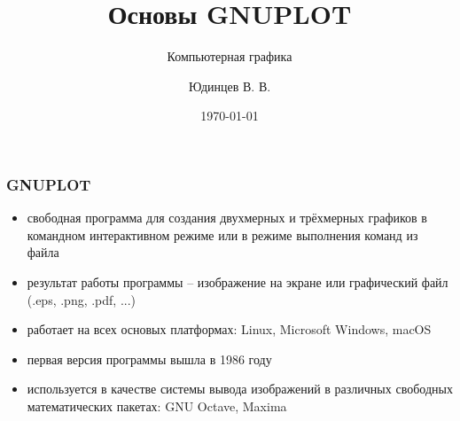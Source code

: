 \documentclass[12pt, compress]{beamer}
\title[Основы GNUPLOT]{Основы GNUPLOT}
\subtitle{Компьютерная графика}
\author[Самарский университет]{Юдинцев В. В.}
\institute{Кафедра теоретической механики}
\date{\today}
\renewcommand{\emph}[1]{\textcolor{dark-blue}{#1}}
\begin{document}
{
\begin{frame}[plain]
\maketitle
\end{frame}
}

%
%

\begin{frame}[c]
\frametitle{GNUPLOT}
\begin{itemize}
\item \emph{свободная} программа для создания двухмерных и трёхмерных графиков в командном интерактивном режиме или в режиме выполнения команд из файла
\item результат работы программы -- изображение на экране или графический файл (.eps, .png, .pdf, ...)
\item работает на всех основых платформах: Linux, Microsoft Windows, macOS
\item первая версия программы вышла в 1986 году
\item используется в качестве системы вывода изображений в различных свободных математических пакетах: GNU Octave, Maxima
\end{itemize}
\end{frame}
\end{document}
